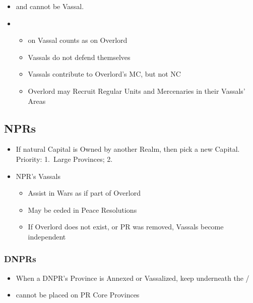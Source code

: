 \documentclass[10pt]{article}
\begin{document}
\begin{itemize}
\begin{itemize}
\begin{itemize}
\begin{itemize}
			\end{itemize}
		\end{itemize}
	\end{itemize}
	\item {} and  cannot be Vassal.
	\item {}
	\begin{itemize}
		\item \claim on Vassal counts as \claim on Overlord
		\item Vassals do not defend themselves
		\item Vassals contribute to Overlord's MC, but not NC
		\item Overlord may Recruit Regular Units and Mercenaries in their Vassals' Areas
	\end{itemize}
\end{itemize}

\subsection*{NPRs }
\begin{itemize}
	\item If natural Capital is Owned by another Realm, then pick a new Capital. Priority: 1.~Large Provinces; 2.~\az
	\item NPR's Vassals
	\begin{itemize}
		\item Assist in Wars as if part of Overlord
		\item May be ceded in Peace Resolutions
		\item If Overlord does not exist, or PR \vassal was removed, Vassals become independent
	\end{itemize}
\end{itemize}

\subsubsection*{DNPRs }
\begin{itemize}
	\item When a DNPR's Province is Annexed or Vassalized, keep \dnpr underneath the \town/\vassal 
	\item \dnpr cannot be placed on PR Core Provinces
\end{itemize}
\end{document}

